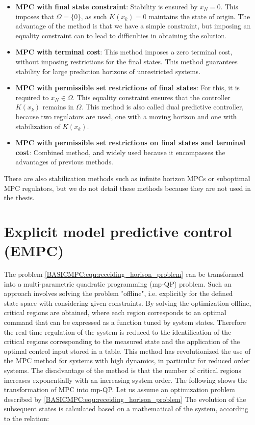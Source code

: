 \begin{itemize}
	\item \textbf{MPC with final state constraint}: Stability is ensured by $x_N=0$. This imposes that $\Omega=\{0\}$, as such $K(x_k)=0$ maintains the state of origin. The advantage of the method is that we have a simple constraint, but imposing an equality constraint can to lead to difficulties in obtaining the solution.
	\item \textbf{MPC with terminal cost}: This method imposes a zero terminal cost, without imposing restrictions
for the final states. This method guarantees stability for large prediction horizons
of unrestricted systems.
	\item \textbf{MPC with permissible set restrictions of final states}: For this, it is required to $x_N\in\Omega$. This equality constraint ensures that the controller $K(x_k)$ remains in $\Omega$. This method is also called dual predictive controller, because two regulators are used, one with a moving horizon and one with stabilization of $K(x_k)$.
	\item \textbf{MPC with permissible set restrictions on final states and terminal cost}: Combined method, and widely used because it encompasses the advantages of previous methods.
\end{itemize}

There are also stabilization methods such as infinite horizon MPCs or suboptimal MPC regulators, but we do not detail these methods because they are not used in the thesis.

\section{Explicit model predictive control (EMPC)}\label{BASICCSR:sec:EMPC}

The problem \ref{BASICMPC:equ:receiding_horison_problem} can be transformed into a multi-parametric quadratic programming (mp-QP) problem. Such an approach involves solving the problem "offline", i.e. explicitly for the defined state-space with considering given constraints. By solving the optimization offline, critical regions are obtained, where each region corresponds to an optimal command that can be expressed as a function tuned by system states. Therefore the real-time regulation of the system is reduced to the identification of the critical regions corresponding to the measured state and the application of the optimal control input stored in a table. This method has revolutionized the use of the MPC method for systems with high dynamics, in particular for reduced order systems. The disadvantage of the method is that the number of critical regions increases exponentially with an increasing system order. The following shows the transformation of MPC into
mp-QP.
Let us assume an optimization problem described by \ref{BASICMPC:equ:receiding_horison_problem} The evolution of the subsequent states is calculated based on a mathematical of the system, according to the relation:

